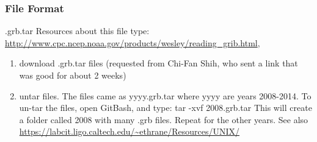 \subsubsection*{File Format}

.grb.tar
Resources about this file type: \url{http://www.cpc.ncep.noaa.gov/products/wesley/reading_grib.html}, 


\begin{enumerate}
\item download .grb.tar files (requested from Chi-Fan Shih, who sent a link that was good for about 2 weeks)

\item untar files. The files came as yyyy.grb.tar where yyyy are years 2008-2014. To un-tar the files, open GitBash, and type: tar -xvf 2008.grb.tar This will create a folder called 2008 with many .grb files. Repeat for the other years. See also \url{https://labcit.ligo.caltech.edu/~ethrane/Resources/UNIX/}






\end{enumerate}
